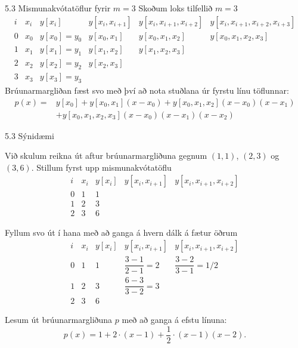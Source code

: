 \begin{frame}{5.3 Mismunakvótatöflur fyrir $m=3$} 
Skoðum loks tilfellið $m = 3$
\begin{equation*}
  \begin{array}{c|c|cccc}
    i & x_i & y[x_i] & y[x_i,x_{i+1}] & y[x_i,x_{i+1},x_{i+2}]
    & y[x_i,x_{i+1},x_{i+2},x_{i+3}] \\
    \hline
    0 & x_0 & y[x_0] = y_0 & y[x_0,x_1] & y[x_0,x_1,x_2]
    & y[x_0,x_1,x_2,x_3] \\
    1 & x_1 & y[x_1] = y_1 & y[x_1,x_2] & y[x_1,x_2,x_3] & \\
    2 & x_2 & y[x_2] = y_2 & y[x_2,x_3] & & \\
    3 & x_3 & y[x_3] = y_3 & & &
  \end{array}
\end{equation*}\pause
Brúunarmargliðan fæst svo með því að nota stuðlana úr fyrstu línu töflunnar:
\begin{align*}
  p(x) = &y[x_0] + y[x_0,x_1](x-x_0) 
  + y[x_0,x_1,x_2](x-x_0)(x-x_1) \\ 
  &+ y[x_0,x_1,x_2,x_3](x-x_0)(x-x_1)(x-x_2)
\end{align*}
\end{frame}

\begin{frame}{5.3 Sýnidæmi} 

Við skulum reikna út aftur brúunarmargliðuna gegnum $(1,1)$, $(2,3)$ og
$(3,6)$. Stillum fyrst upp mismunakvótatöflu 
\begin{equation*}
  \begin{array}{cc||ccc}
    i & x_i & y[x_i] & y[x_i,x_{i+1}] & y[x_i,x_{i+1},x_{i+2}] \\
    \hline
    0 & 1   &  1     &    &   \\
    1 & 2   &  3     &    &   \\
    2 & 3   &  6     &    &   
  \end{array}
\end{equation*}

\pause
Fyllum svo út í hana með að ganga á hvern dálk á fætur öðrum
\begin{equation*}
  \begin{array}{cc||ccc}
    i & x_i & y[x_i] & y[x_i,x_{i+1}] & y[x_i,x_{i+1},x_{i+2}] \\
    \hline
    0 & 1 & 1 & \dfrac{3-1}{2-1} = 2 & \dfrac{3-2}{3-1} = 1/2  \\
    1 & 2 & 3 & \dfrac{6-3}{3-2} = 3 & \\
    2 & 3 & 6 & &   
  \end{array}
\end{equation*}

\pause
Lesum út brúunarmargliðuna $p$ með að ganga á efstu línuna:
\begin{equation*}
  p(x) = 1 + 2 \cdot (x-1) + \frac{1}{2} \cdot (x-1)(x-2).
\end{equation*}
\end{frame}

